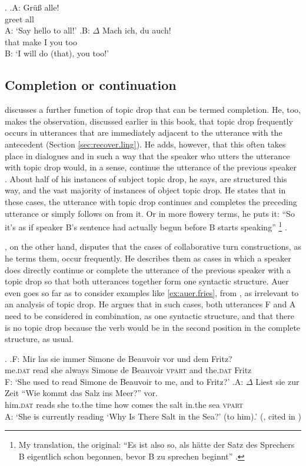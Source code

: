 \ex.\label{ex:response.auer}
\ag.A: Grüß alle!\\
{} greet all\\
A: `Say hello to all!'
\bg.B: $\Delta$ Mach ich, du auch!\\
{} that make I you too\\
B: `I will do (that), you too!' \citep[212, simplified]{auer1993}

\subsection{Completion or continuation}
\citet{poitou1993} discusses a further function of topic drop that can be termed completion.
He, too, makes the observation, discussed earlier in this book, that topic drop frequently occurs in utterances that are immediately adjacent to the utterance with the antecedent (Section \ref{sec:recover.ling}).
He adds, however, that this often takes place in dialogues and in such a way that the speaker who utters the utterance with topic drop would, in a sense, continue the utterance of the previous speaker \citep[125]{poitou1993}.
About half of his instances of subject topic drop, he says, are structured this way, and the vast majority of instances of object topic drop.
He states that in these cases, the utterance with topic drop continues and completes the preceding utterance or simply follows on from it.
Or in more flowery terms, he puts it:  ``So it's as if speaker B's sentence had actually begun before B starts speaking''%
\footnote{My translation, the original: ``Es ist also so, als hätte der Satz des Sprechers B eigentlich schon begonnen, bevor B zu sprechen beginnt'' \citep[125]{poitou1993}.}
%
\citep[125]{poitou1993}.

\citet[202--203]{auer1993}, on the other hand, disputes that the cases of collaborative turn constructions, as he terms them, occur frequently.
He describes them as cases in which a speaker does directly continue or complete the utterance of the previous speaker with a topic drop so that both utterances together form one syntactic structure.
Auer even goes so far as to consider examples like \ref{ex:auer.fries}, from \citet{fries1988}, as irrelevant to an analysis of topic drop.
He argues that in such cases, both utterances F and A need to be considered in combination, as one syntactic structure, and that there is no topic drop because the verb would be in the second position in the complete structure, as usual.

\ex.\label{ex:auer.fries}
\ag.F: Mir las sie immer Simone de Beauvoir vor und dem Fritz?\\
{} me.\textsc{dat} read she always Simone de Beauvoir \textsc{vpart} and the.\textsc{dat} Fritz\\
F: `She used to read Simone de Beauvoir to me, and to Fritz?'
\bg.A: $\Delta$ Liest sie zur Zeit ``Wie kommt das Salz ins Meer?'' vor.\\
{} him.\textsc{dat} reads she to.the time how comes the salt in.the sea \textsc{vpart} \\
A: `She is currently reading `Why Is There Salt in the Sea?' (to him).' (\cite[31]{fries1988}, cited in \cite[202]{auer1993})

